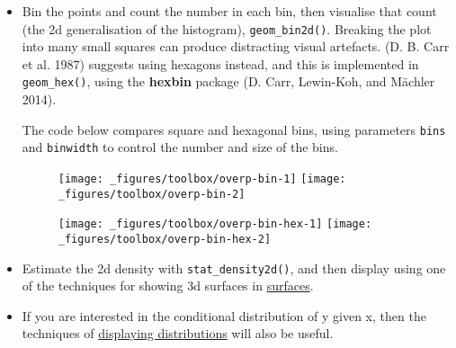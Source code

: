 \begin{itemize}
\item
  Bin the points and count the number in each bin, then visualise that
  count (the 2d generalisation of the histogram),
  \texttt{geom\_bin2d()}. Breaking the plot into many small squares can
  produce distracting visual artefacts. (D. B. Carr et al. 1987)
  suggests using hexagons instead, and this is implemented in
  \texttt{geom\_hex()}, using the \textbf{hexbin} package (D. Carr,
  Lewin-Koh, and Mächler 2014). 

  The code below compares square and hexagonal bins, using parameters
  \texttt{bins} and \texttt{binwidth} to control the number and size of
  the bins.  
   

\begin{Shaded}
\begin{Highlighting}[]
\StringTok{ }\NormalTok{()}
\StringTok{ }\NormalTok{(} \NormalTok{)}
\end{Highlighting}
\end{Shaded}

  \begin{figure}[H]
    \texttt{[image: \_figures/toolbox/overp-bin-1]}%
    \texttt{[image: \_figures/toolbox/overp-bin-2]}
  \end{figure}

\begin{Shaded}
\begin{Highlighting}[]
\StringTok{ }\NormalTok{()}
\StringTok{ }\NormalTok{(} \NormalTok{)}
\end{Highlighting}
\end{Shaded}

  \begin{figure}[H]
    \texttt{[image: \_figures/toolbox/overp-bin-hex-1]}%
    \texttt{[image: \_figures/toolbox/overp-bin-hex-2]}
  \end{figure}
\item
  Estimate the 2d density with \texttt{stat\_density2d()}, and then
  display using one of the techniques for showing 3d surfaces in
  \hyperref[sec:surface]{surfaces}.
\item
  If you are interested in the conditional distribution of y given x,
  then the techniques of \hyperref[sub:distribution]{displaying
  distributions} will also be useful.
\end{itemize}

